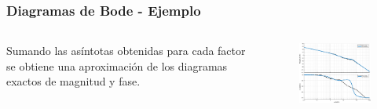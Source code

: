 \documentclass[aspectratio=169]{beamer}
\theoremstyle{definition}
\theoremstyle{plain}
\theoremstyle{remark}
\begin{document}
\begin{frame}[<+->]\frametitle{Diagramas de Bode - Ejemplo}
	\vspace*{-2mm}
	\begin{columns}
		\begin{column}{0.3\textwidth}
			Sumando las asíntotas obtenidas para cada factor se obtiene una aproximación de los diagramas exactos de magnitud y fase.
		\end{column}
		\begin{column}{0.7\textwidth}
			\begin{figure}
				\centering
				\includegraphics[width=9cm]{images/bodeExample1b.eps}
			\end{figure}
		\end{column}
	\end{columns}
\end{frame}
\end{document}
